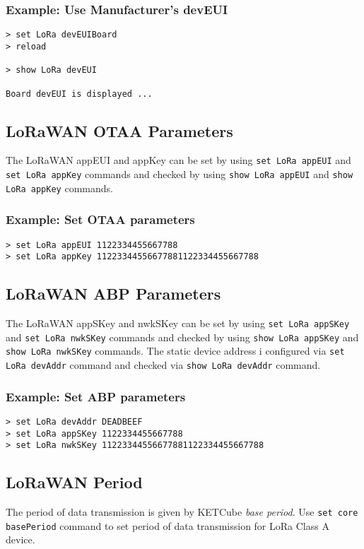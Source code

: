 \documentclass[twoside,a4paper]{refart}
\begin{document}
\subsubsection*{Example: Use Manufacturer's devEUI}
\begin{Verbatim}[frame=single, fontsize=\small]
> set LoRa devEUIBoard
> reload

> show LoRa devEUI

Board devEUI is displayed ...
\end{Verbatim}

\subsection{LoRaWAN OTAA Parameters}
The LoRaWAN appEUI and appKey can be set by using {\tt set LoRa appEUI} and {\tt set LoRa appKey} commands and checked by using {\tt show LoRa appEUI} and {\tt show LoRa appKey} commands.
  
\subsubsection*{Example: Set OTAA parameters}
\begin{Verbatim}[frame=single, fontsize=\small]
> set LoRa appEUI 1122334455667788
> set LoRa appKey 11223344556677881122334455667788
\end{Verbatim}
  
\subsection{LoRaWAN ABP Parameters}
The LoRaWAN appSKey and nwkSKey can be set by using {\tt set LoRa appSKey} and {\tt set LoRa nwkSKey} commands and checked by using {\tt show LoRa appSKey} and {\tt show LoRa nwkSKey} commands. The static device address i configured via  {\tt set LoRa devAddr} command and checked via  {\tt show LoRa devAddr} command.
  
\subsubsection*{Example: Set ABP parameters}
\begin{Verbatim}[frame=single, fontsize=\small]
> set LoRa devAddr DEADBEEF
> set LoRa appSKey 1122334455667788
> set LoRa nwkSKey 11223344556677881122334455667788
\end{Verbatim}

\subsection{LoRaWAN Period}
The period of data transmission is given by KETCube {\it base period}. Use {\tt set core basePeriod} command to set period of data transmission for LoRa Class A device.
  
\end{document}
